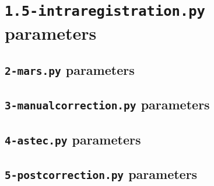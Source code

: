\section{\texttt{1.5-intraregistration.py} parameters}
\label{sec:cli:parameters:intraregistration}


\subsection{\texttt{2-mars.py} parameters}
\label{sec:cli:parameters:mars}


\subsection{\texttt{3-manualcorrection.py} parameters}
\label{sec:cli:parameters:manualcorrection}


\subsection{\texttt{4-astec.py} parameters}
\label{sec:cli:parameters:astec}


\subsection{\texttt{5-postcorrection.py} parameters}
\label{sec:cli:parameters:postcorrection}







